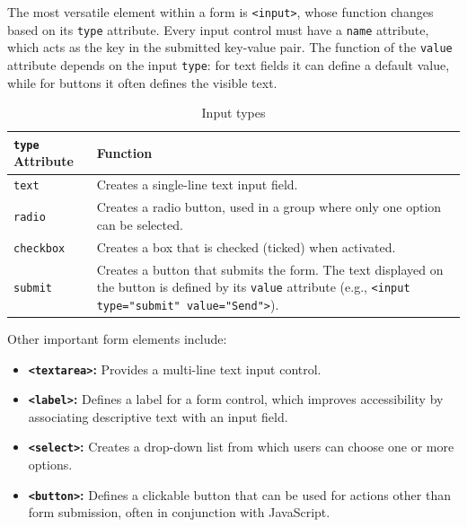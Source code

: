 \documentclass{scrbook}
\begin{document}
The most versatile element within a form is \texttt{<input>}, whose function changes based on its \texttt{type} attribute. Every input control must have a \texttt{name} attribute, which acts as the key in the submitted key-value pair. The function of the \texttt{value} attribute depends on the input \texttt{type}: for text fields it can define a default value, while for buttons it often defines the visible text.

\begin{table}[h!]
    \centering
    \begin{tabularx}{\textwidth}{|p{7em}|X|} \hline
        \texttt{type} Attribute & Function \\ \hline
    
        \texttt{text} & Creates a single-line text input field. \\ \hline
    
        \texttt{radio} & Creates a radio button, used in a group where only one option can be selected. \\ \hline

        \texttt{checkbox} & Creates a box that is checked (ticked) when activated. \\ \hline
    
        \texttt{submit} & Creates a button that submits the form. The text displayed on the button is defined by its \texttt{value} attribute (e.g., \texttt{<input type="submit" value="Send">}). \\ \hline
    \end{tabularx}
    \caption{Input types}
\end{table}

Other important form elements include:

\begin{itemize}
    \item
    \textbf{\texttt{<textarea>}:} Provides a multi-line text input control.

    \item
    \textbf{\texttt{<label>}:} Defines a label for a form control, which improves accessibility by associating descriptive text with an input field.

    \item
    \textbf{\texttt{<select>}:} Creates a drop-down list from which users can choose one or more options.

    \item
    \textbf{\texttt{<button>}:} Defines a clickable button that can be used for actions other than form submission, often in conjunction with JavaScript.
\end{itemize}
\end{document}
